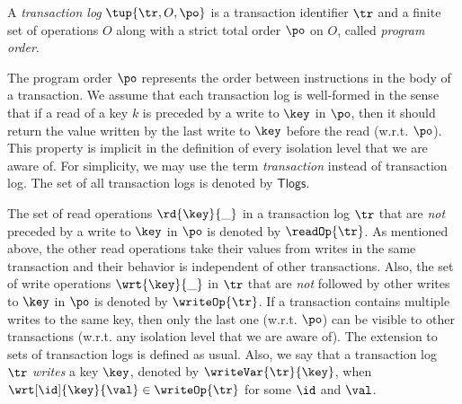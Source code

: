 \begin{definition}
 A \emph{transaction log} $\tup{\tr, O, \po}$ is a transaction identifier $\tr$ and a finite set of operations $O$ along with a strict total order $\po$ on $O$, called \emph{program order}.
\end{definition}

The program order $\po$ represents the order between instructions in the body of a transaction. We assume that each transaction log is well-formed in the sense that if a read of a key $k$ is preceded by a write to $\key$ in $\po$, then it should return the value written by the last write to $\key$ before the read (w.r.t. $\po$). This property is implicit in the definition of every isolation level that we are aware of. For simplicity, we may use the term \emph{transaction} instead of transaction log. The  set of all transaction logs is denoted by $\mathsf{Tlogs}$.


The set of read operations $\rd{\key}{\_}$ in a transaction log $\tr$ that are \emph{not} preceded by a write to $\key$ in $\po$ is denoted by $\readOp{\tr}$. As mentioned above, the other read operations take their values from writes in the same transaction and their behavior is independent of other transactions. Also, the set of write operations $\wrt{\key}{\_}$ in $\tr$ that are \emph{not} followed by other writes to $\key$ in $\po$ is denoted by $\writeOp{\tr}$. If a transaction contains multiple writes to the same key, then only the last one (w.r.t. $\po$) can be visible to other transactions (w.r.t. any isolation level that we are aware of). The extension to sets of transaction logs is defined as usual. 
Also, we say that a transaction log $\tr$ \emph{writes} a key $\key$, denoted by $\writeVar{\tr}{\key}$, when $\wrt[\id]{\key}{\val}\in \writeOp{\tr}$ for some $\id$ and $\val$. 



